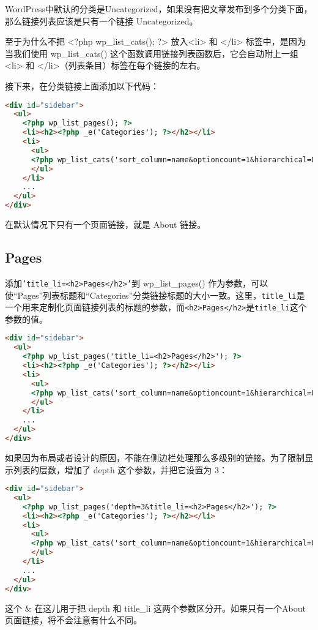 WordPress中默认的分类是Uncategorized，如果没有把文章发布到多个分类下面，那么链接列表应该是只有一个链接 Uncategorized。

至于为什么不把 <?php wp\_list\_cats(); ?> 放入<li> 和 </li> 标签中，是因为当我们使用 wp\_list\_cats() 这个函数调用链接列表函数后，它会自动附上一组 <li> 和 </li>（列表条目）标签在每个链接的左右。


接下来，在分类链接上面添加以下代码：


\begin{lstlisting}[language=HTML]
<div id="sidebar">
  <ul>
    <?php wp_list_pages(); ?>
    <li><h2><?php _e('Categories'); ?></h2></li>
    <li>
      <ul>
      <?php wp_list_cats('sort_column=name&optioncount=1&hierarchical=0'); ?>
      </ul>
    </li>
    ...
  </ul>
</div>
\end{lstlisting}

在默认情况下只有一个页面链接，就是 About 链接。 

\subsection{Pages}

添加\texttt{'title\_li=<h2>Pages</h2>'}到 wp\_list\_pages() 作为参数，可以使“Pages”列表标题和“Categories”分类链接标题的大小一致。这里，\texttt{title\_li}是一个用来定制化页面链接列表的标题的参数，而\texttt{<h2>Pages</h2>}是\texttt{title\_li}这个参数的值。

\begin{lstlisting}[language=HTML]
<div id="sidebar">
  <ul>
    <?php wp_list_pages('title_li=<h2>Pages</h2>'); ?>
    <li><h2><?php _e('Categories'); ?></h2></li>
    <li>
      <ul>
      <?php wp_list_cats('sort_column=name&optioncount=1&hierarchical=0'); ?>
      </ul>
    </li>
    ...
  </ul>
</div>
\end{lstlisting}

如果因为布局或者设计的原因，不能在侧边栏处理那么多级别的链接。为了限制显示列表的层数，增加了 depth 这个参数，并把它设置为 3：

\begin{lstlisting}[language=HTML]
<div id="sidebar">
  <ul>
    <?php wp_list_pages('depth=3&title_li=<h2>Pages</h2>'); ?>
    <li><h2><?php _e('Categories'); ?></h2></li>
    <li>
      <ul>
      <?php wp_list_cats('sort_column=name&optioncount=1&hierarchical=0'); ?>
      </ul>
    </li>
    ...
  </ul>
</div>
\end{lstlisting}

这个 \& 在这儿用于把 depth 和 title\_li 这两个参数区分开。如果只有一个About页面链接，将不会注意有什么不同。

